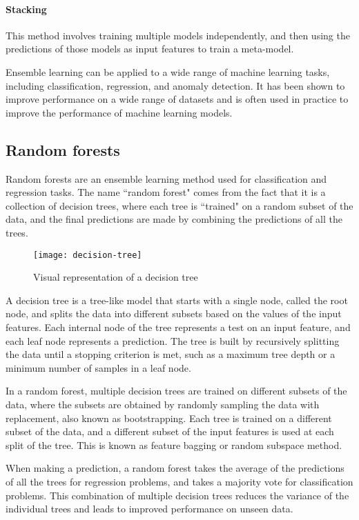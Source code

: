 \paragraph{Stacking} This method involves training multiple models independently, and then using the predictions of those models as input features to train a meta-model.

Ensemble learning can be applied to a wide range of machine learning tasks, including classification, regression, and anomaly detection. 
It has been shown to improve performance on a wide range of datasets and is often used in practice to improve the performance of machine learning models.


\subsection{Random forests}

Random forests \cite{breiman2001random, charles2020random} are an ensemble learning method used for classification and regression tasks. 
The name ``random forest" comes from the fact that it is a collection of decision trees, where each tree is ``trained" on a random subset of the data, and the final predictions are made by combining the predictions of all the trees.

\begin{figure}[H]
  \centering
  \texttt{[image: decision-tree]}
  \caption{Visual representation of a decision tree \cite{scikit}}
\end{figure}

A decision tree is a tree-like model that starts with a single node, called the root node, and splits the data into different subsets based on the values of the input features.
Each internal node of the tree represents a test on an input feature, and each leaf node represents a prediction.
The tree is built by recursively splitting the data until a stopping criterion is met, such as a maximum tree depth or a minimum number of samples in a leaf node.

In a random forest, multiple decision trees are trained on different subsets of the data, where the subsets are obtained by randomly sampling the data with replacement, also known as bootstrapping.
Each tree is trained on a different subset of the data, and a different subset of the input features is used at each split of the tree. 
This is known as feature bagging or random subspace method.

When making a prediction, a random forest takes the average of the predictions of all the trees for regression problems, and takes a majority vote for classification problems.
This combination of multiple decision trees reduces the variance of the individual trees and leads to improved performance on unseen data.

